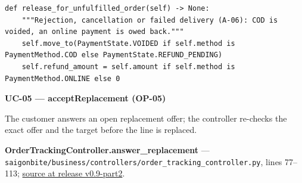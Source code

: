 \begin{lstlisting}
def release_for_unfulfilled_order(self) -> None:
    """Rejection, cancellation or failed delivery (A-06): COD is voided, an online payment is owed back."""
    self.move_to(PaymentState.VOIDED if self.method is PaymentMethod.COD else PaymentState.REFUND_PENDING)
    self.refund_amount = self.amount if self.method is PaymentMethod.ONLINE else 0
\end{lstlisting}
\textbf{UC-05 --- acceptReplacement (OP-05)}

The customer answers an open replacement offer; the controller re-checks the exact offer and the target before the line is replaced.

\textbf{OrderTrackingController.answer\_replacement} --- \texttt{saigonbite/\allowbreak{}business/\allowbreak{}controllers/\allowbreak{}order\_\allowbreak{}tracking\_\allowbreak{}controller.\allowbreak{}py}, lines 77--113; \href{\TargetRepo\detokenize{/blob/v0.9-part2/saigonbite/business/controllers/order_tracking_controller.py#L77-L113}}{source at release v0.9-part2}.

